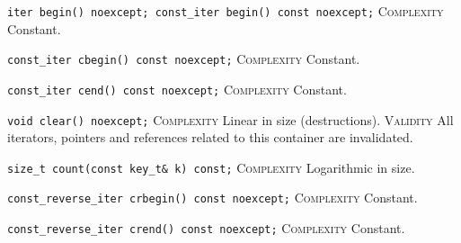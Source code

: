 \noindent{}\hspace*{0.25em}\lstinline[basicstyle=\ttfamily\color{cgreen}]{iter begin() noexcept; const_iter begin() const noexcept;} \textsc{Complexity} Constant.\\\vspace{-0.6em}

\noindent{}\hspace*{0.25em}\lstinline[basicstyle=\ttfamily\color{cgreen}]{const_iter cbegin() const noexcept;} \textsc{Complexity} Constant.\\\vspace{-0.6em}

\noindent{}\hspace*{0.25em}\lstinline[basicstyle=\ttfamily\color{cgreen}]{const_iter cend() const noexcept;} \textsc{Complexity} Constant.\\\vspace{-0.6em}

\noindent{}\hspace*{0.25em}\lstinline[basicstyle=\ttfamily\color{corange}]{void clear() noexcept;} \textsc{Complexity} Linear in size (destructions). \textsc{Validity} All iterators, pointers and references related to this container are invalidated.\\\vspace{-0.6em}

\noindent{}\hspace*{0.25em}\lstinline[basicstyle=\ttfamily\color{clime}]{size_t count(const key_t& k) const;} \textsc{Complexity} Logarithmic in size.\\\vspace{-0.6em}

\noindent{}\hspace*{0.25em}\lstinline[basicstyle=\ttfamily\color{cgreen}]{const_reverse_iter crbegin() const noexcept;} \textsc{Complexity} Constant.\\\vspace{-0.6em}

\noindent{}\hspace*{0.25em}\lstinline[basicstyle=\ttfamily\color{cgreen}]{const_reverse_iter crend() const noexcept;} \textsc{Complexity} Constant.\\\vspace{-0.6em}

